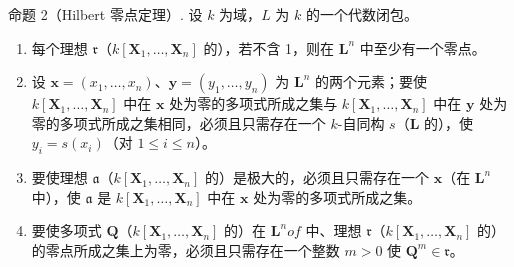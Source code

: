 命题 2（Hilbert 零点定理）. 设 \(k\) 为域，\(L\) 为 \(k\) 的一个代数闭包。

\begin{enumerate}
\def\labelenumi{(\roman{enumi})}
\item
  每个理想 \(\mathfrak{r}\)（\(k[\mathbf{X}_1, \ldots, \mathbf{X}_n]\) 的），若不含 1，则在 \(\mathbf{L}^n\) 中至少有一个零点。
\item
  设 \(\mathbf{x} = (x_1, \ldots, x_n)\)、\(\mathbf{y} = (y_1, \ldots, y_n)\) 为 \(\mathbf{L}^n\) 的两个元素；要使 \(k[\mathbf{X}_1, \ldots, \mathbf{X}_n]\) 中在 \(\mathbf{x}\) 处为零的多项式所成之集与 \(k[\mathbf{X}_1, \ldots, \mathbf{X}_n]\) 中在 \(\mathbf{y}\) 处为零的多项式所成之集相同，必须且只需存在一个 \(k\)-自同构 \(s\)（\(\mathbf{L}\) 的），使 \(y_i = s(x_i)\)（对 \(1 \leqslant i \leqslant n\)）。
\item
  要使理想 \(\mathfrak{a}\)（\(k[\mathbf{X}_1, \ldots, \mathbf{X}_n]\) 的）是极大的，必须且只需存在一个 \(\mathbf{x}\)（在 \(\mathbf{L}^n\) 中），使 \(\mathfrak{a}\) 是 \(k[\mathbf{X}_1, \ldots, \mathbf{X}_n]\) 中在 \(\mathbf{x}\) 处为零的多项式所成之集。
\item
  要使多项式 \(\mathbf{Q}\)（\(k[\mathbf{X}_1, \ldots, \mathbf{X}_n]\) 的）在 \(\mathbf{L}^n of\) 中、理想 \(\mathfrak{r}\)（\(k[\mathbf{X}_1, \ldots, \mathbf{X}_n]\) 的）的零点所成之集上为零，必须且只需存在一个整数 \(m > 0\) 使 \(\mathbf{Q}^m \in \mathfrak{r}\)。
\end{enumerate}

